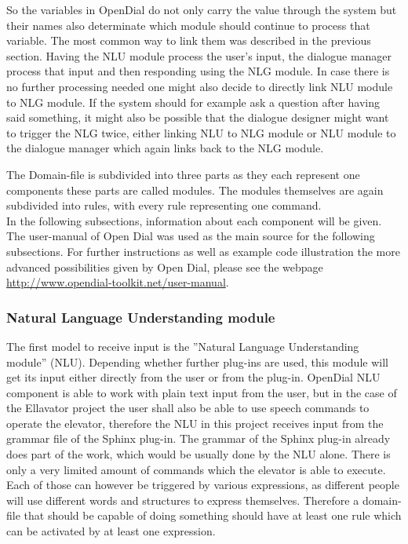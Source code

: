 \documentclass[a4paper, 12pt]{article}
\begin{document}
So the variables in OpenDial do not only carry the value through the system but their names also determinate which module should continue to process that variable.
The most common way to link them was described in the previous section.
Having the NLU module process the user's input, the dialogue manager process that input and then responding using the NLG module.
In case there is no further processing needed one might also decide to directly link NLU module to NLG module. 
If the system should for example ask a question after having said something, it might also be possible that the dialogue designer might want to trigger the NLG twice, either linking NLU to NLG module or NLU module to the dialogue manager which again links back to the NLG module.


The Domain-file is subdivided into three parts as they each represent one components these parts are called modules. 
The modules themselves are again subdivided into rules, with every rule representing one command.\\

In the following subsections, information about each component will be given.
The user-manual of Open Dial \cite{OpenDial} was used as the main source for the following subsections.
For further instructions as well as example code illustration the more advanced possibilities given by Open Dial, please see the webpage \url{http://www.opendial-toolkit.net/user-manual}.

\subsubsection{Natural Language Understanding module}

The first model to receive input is the ”Natural Language Understanding module” (NLU). 
Depending whether further plug-ins are used, this module will get its input either directly from the user or from the plug-in.
OpenDial NLU component is able to work with plain text input from the user, but in the case of the Ellavator project the user shall also be able to use speech commands to operate the elevator, therefore the NLU in this project receives input from the grammar file of the Sphinx plug-in.
The grammar of the Sphinx plug-in already does part of the work, which would be usually done by the NLU alone.
There is only a very limited amount of commands which the elevator is able to execute.
Each of those can however be triggered by various expressions, as different people will use different words and structures to express themselves.
Therefore a domain-file that should be capable of doing something should have at least one rule which can be activated by at least one expression. \newline
\end{document}
